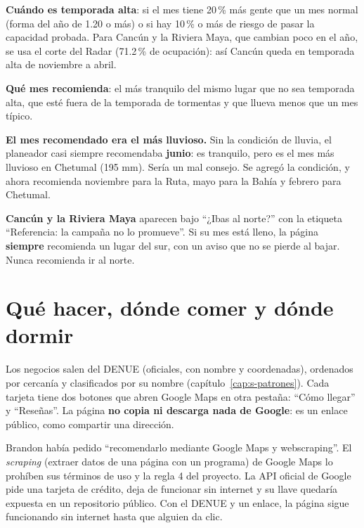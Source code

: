 \textbf{Cuándo es temporada alta}: si el mes tiene 20\,\% más gente que un mes normal (forma del año de 1.20 o más) o si hay
10\,\% o más de riesgo de pasar la capacidad probada. Para Cancún y la Riviera Maya, que cambian poco en el año, se usa el
corte del Radar (71.2\,\% de ocupación): así Cancún queda en temporada alta de noviembre a abril.

\textbf{Qué mes recomienda}: el más tranquilo del mismo lugar que no sea temporada alta, que esté fuera de la temporada de
tormentas y que llueva menos que un mes típico.

\begin{error}
\textbf{El mes recomendado era el más lluvioso.} Sin la condición de lluvia, el planeador casi siempre recomendaba
\textbf{junio}: es tranquilo, pero es el mes más lluvioso en Chetumal (195 mm). Sería un mal consejo. Se agregó la condición,
y ahora recomienda noviembre para la Ruta, mayo para la Bahía y febrero para Chetumal.
\end{error}

\textbf{Cancún y la Riviera Maya} aparecen bajo ``¿Ibas al norte?'' con la etiqueta ``Referencia: la campaña no lo
promueve''. Si su mes está lleno, la página \textbf{siempre} recomienda un lugar del sur, con un aviso que no se pierde al
bajar. Nunca recomienda ir al norte.

\section{Qué hacer, dónde comer y dónde dormir}
Los negocios salen del DENUE (oficiales, con nombre y coordenadas), ordenados por cercanía y clasificados por su nombre
(capítulo~\ref{cap:s-patrones}). Cada tarjeta tiene dos botones que abren Google Maps en otra pestaña: ``Cómo llegar'' y
``Reseñas''. La página \textbf{no copia ni descarga nada de Google}: es un enlace público, como compartir una dirección.

\begin{porque}
Brandon había pedido ``recomendarlo mediante Google Maps y webscraping''. El \emph{scraping} (extraer datos de una página con
un programa) de Google Maps lo prohíben sus términos de uso y la regla 4 del proyecto. La API oficial de Google pide una
tarjeta de crédito, deja de funcionar sin internet y su llave quedaría expuesta en un repositorio público. Con el DENUE y un
enlace, la página sigue funcionando sin internet hasta que alguien da clic.
\end{porque}

